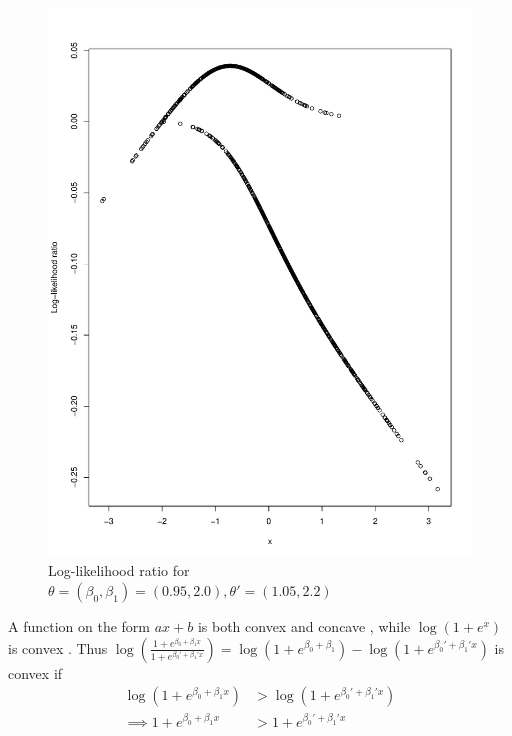 \begin{figure}
    \centering
    \includegraphics[scale = 0.7]{figures/loglik_ratio_logist2.pdf}
    \caption{Log-likelihood ratio for $\theta = \left(\beta_0, \beta_1\right) = \left(0.95, 2.0\right), \theta' = \left(1.05, 2.2\right)$}
    \label{fig:loglik_ratio_logistic2}
\end{figure}{
A function on the form $ax + b$ is both convex and concave , while $\log\left(1 + e^x\right)$ is convex . 
Thus $\log\left(\frac{1 + e^{\beta_0 + \beta_1 x}}{1 + e^{\beta_0' + \beta_1'x}}\right) = \log\left(1 + e^{\beta_0 + \beta_1}\right) - \log\left(1+ e^{ \beta_0' + \beta_1'x}\right)$ is convex if 
\begin{equation*}
\begin{split}
    \log\left(1 + e^{\beta_0 + \beta_1x}\right) &> \log\left(1 + e^{\beta_0' + \beta_1' x}\right)  \\
    \implies 1 + e^{\beta_0 + \beta_1x} &> 1 + e^{\beta_0' + \beta_1'x} \\

\end{split}
\end{equation*}}
